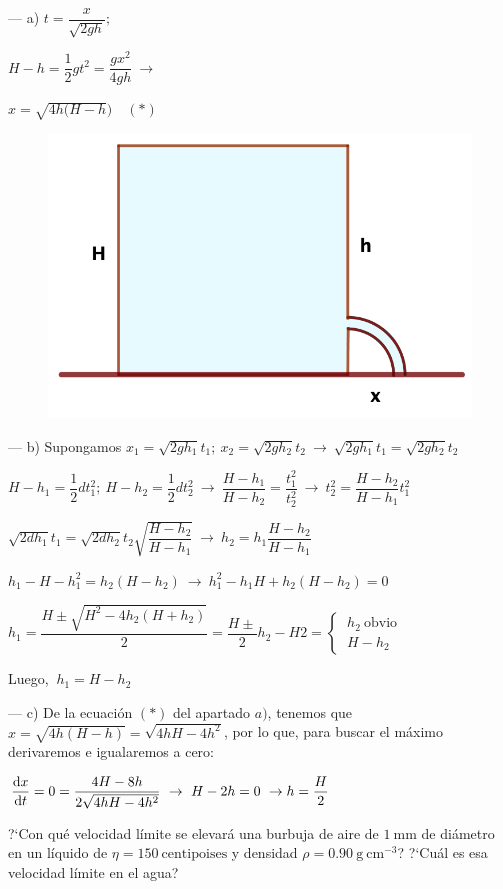 \begin{multicols}{2}
$\quad$

--- a) $t=\dfrac{x}{\sqrt{2gh}};$

$H-h=\dfrac 1 2g t^2 = \dfrac {gx^2}{4gh} \ \to $

$x=\sqrt{4h(H-h}) \quad (*)$
\begin{figure}[H]
	\centering
	\includegraphics[width=.35\textwidth]{imagenes/imagenes18/T18IM17.png}
	\end{figure}	
\end{multicols}
--- b) Supongamos
$x_1=\sqrt{2gh_1}t_1;\ x_2=\sqrt{2gh_2}t_2 \ \to \ \sqrt{2gh_1}t_1= \sqrt{2gh_2}t_2$

$H-h_1=\dfrac 1 2 dt_1^2; \ H-h_2=\dfrac 1 2 dt_2^2 \ \to \ \dfrac{H-h_1}{H-h_2}=\dfrac{t_1^2}{t_2^2} \ \to \ t_2^2=\dfrac{H-h_2}{H-h_1}t_1^2$

$\sqrt{2dh_1}t_1=\sqrt{2dh_2}t_2 \sqrt{\dfrac{H-h_2}{H-h_1}} \ \to \ h_2=h_1 \dfrac{H-h_2}{H-h_1}$

$h_1-H-h_1^2=h_2(H-h_2) \ \to \ h_1^2-h_1H+h_2(H-h_2)=0$

$h_1=\dfrac{H\pm \sqrt{H^2-4h_2(H+h_2)}}{2}=\dfrac{H\pm} 2 h_2 - H{2} = \begin{cases} \ h_2\ \text{obvio} \\ \ H-h_2  \end{cases}$

Luego, $\ h_1=H-h_2$

--- c) De la ecuación $(*)$ del apartado $a)$, tenemos que $x=\sqrt{4h(H-h)}=\sqrt{4hH-4h^2}$, por lo que, para buscar el máximo derivaremos e igualaremos a cero:

$\displaystyle \dv{x}{t} =0=\dfrac{4H-8h}{2\sqrt{4hH-4h^2}} \ \to \ H-2h=0 \ \to h=\dfrac H 2$

\vspace{10mm} %
\begin{prob}
?`Con qué velocidad límite se elevará una burbuja de aire de $1\ \mathrm{mm}$ de diámetro en un líquido de $\eta=150\ \mathrm{centipoises}$ y densidad $\rho=0.90\ \mathrm{g\ cm}^{-3}$? ?`Cuál es esa velocidad límite en el agua?	
\end{prob}

